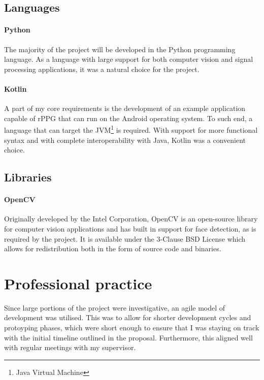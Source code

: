 \subsection{Languages}
\paragraph{Python}
The majority of the project will be developed in the Python \cite{Python} programming language. As a language with large support for both computer vision and signal processing applications, it
was a natural choice for the project. 

\paragraph{Kotlin}
A part of my core requirements is the development of an example application capable of rPPG that can run on the Android operating system. 
To such end, a language that can target the JVM\footnote{Java Virtual Machine} is required. 
With support for more functional syntax and with complete interoperability with Java, Kotlin \cite{Kotlin} was a convenient choice.

\subsection{Libraries}
\label{section:libraries}
\paragraph{OpenCV} 
Originally developed by the Intel Corporation, OpenCV \cite{OpenCV} is an open-source library for computer vision applications and has built in support for face detection, as is required by the project. It is available under the 3-Clause BSD License \cite{bsd} which allows for redistribution both in the form of source code and binaries. 


\section{Professional practice}
Since large portions of the project were investigative, an agile model of development was utilised. 
This was to allow for shorter development cycles and protoyping phases, which were short enough to ensure that I was staying on track with the 
initial timeline outlined in the proposal. Furthermore, this aligned well with regular meetings with my supervisor.

